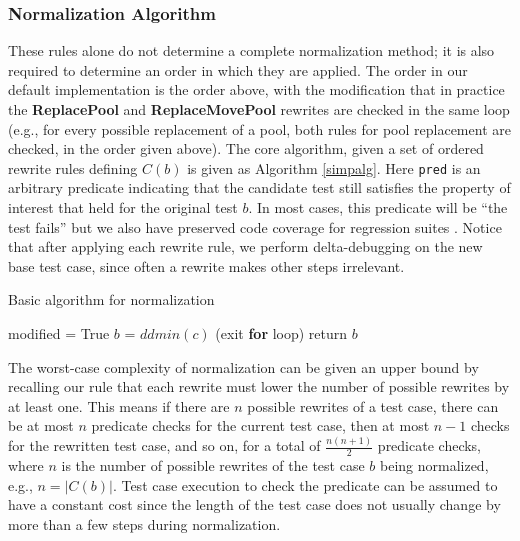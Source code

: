 \subsubsection{Normalization Algorithm}

These rules alone do not determine a complete normalization method; it is
also required to determine an order in which they are applied.  The
order in our default implementation is the order above, with the
modification that in practice the {\bf ReplacePool} and {\bf
  ReplaceMovePool} rewrites are checked in the same loop
(e.g., for every possible replacement of a pool, both rules for pool replacement are
checked, in the order given above).  The core algorithm, given a set
of ordered rewrite rules defining $C(b)$ is given as Algorithm
\ref{simpalg}.  Here {\tt pred} is an arbitrary predicate indicating
that the candidate test still satisfies the property of interest that
held for the original test $b$.  In most cases, this predicate will be
``the test fails'' but we also have preserved
code coverage for regression suites \cite{icst2014}.  Notice that
after applying each rewrite rule, we perform delta-debugging on the
new base test case, since often a rewrite makes other steps irrelevant.

\begin{algorithm}
\caption{Basic algorithm for normalization}
\label{simpalg}
\begin{algorithmic}[1]
\State modified = True 
\State $b$ = $ddmin(c)$
 (exit {\bf for} loop) 
\EndIf 
\EndFor 
\EndWhile 
\State return $b$
\end{algorithmic}
\end{algorithm}

The worst-case complexity of normalization can be given an upper bound by recalling our
rule that each rewrite must lower the number of possible rewrites by
at least one.  This means if there are $n$ possible rewrites of a
test case, there can be at most $n$ predicate checks for the current test case,
then at most $n-1$ checks for the rewritten test case, and so on, for
a total of $\frac{n(n+1)}{2}$ predicate checks, where $n$ is the
number of possible rewrites of the test case $b$ being normalized, e.g.,
$n = |C(b)|$.  Test case execution to check the predicate can be
assumed to have a constant cost since the length of the test case does
not usually change by more than a few steps during normalization. 

